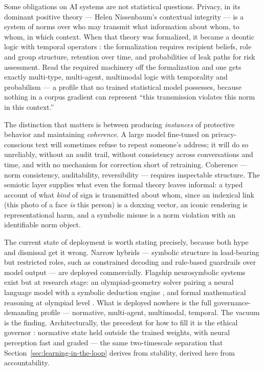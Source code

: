 \documentclass[11pt,a4paper]{article}
\begin{document}
Some obligations on AI systems are not statistical questions. Privacy, in
its dominant positive theory --- Helen Nissenbaum's contextual integrity
\autocite{nissenbaum2009privacy} --- is a system of norms over who may
transmit what information about whom, to whom, in which context. When that
theory was formalized, it became a deontic logic with temporal operators
\autocite{barth2006privacy}: the formalization requires recipient beliefs,
role and group structure, retention over time, and probabilities of leak
paths for risk assessment. Read the required machinery off the formalization
and one gets exactly multi-type, multi-agent, multimodal logic with
temporality and probabilism --- a profile that no trained statistical model
possesses, because nothing in a corpus gradient can represent ``this
transmission violates this norm in this context.''

The distinction that matters is between producing \emph{instances} of
protective behavior and maintaining \emph{coherence}. A large model fine-tuned
on privacy-conscious text will sometimes refuse to repeat someone's address;
it will do so unreliably, without an audit trail, without consistency across
conversations and time, and with no mechanism for correction short of
retraining. Coherence --- norm consistency, auditability, reversibility ---
requires inspectable structure. The semiotic layer supplies what even the
formal theory leaves informal: a typed account of what \emph{kind} of sign
is transmitted about whom, since an indexical link (this photo of a face
\emph{is} this person) is a doxxing vector, an iconic rendering is
representational harm, and a symbolic misuse is a norm violation with an
identifiable norm object.

The current state of deployment is worth stating precisely, because both
hype and dismissal get it wrong. Narrow hybrids --- symbolic structure in
load-bearing but restricted roles, such as constrained decoding and
rule-based guardrails over model output --- are deployed commercially.
Flagship neurosymbolic systems exist but at research stage: an
olympiad-geometry solver pairing a neural language model with a symbolic
deduction engine \autocite{trinh2024alphageometry}, and formal mathematical
reasoning at olympiad level \autocite{hubert2025alphaproof}. What is deployed
nowhere is the full governance-demanding profile --- normative, multi-agent,
multimodal, temporal. The vacuum is the finding. Architecturally, the
precedent for how to fill it is the ethical governor
\autocite{arkin2009governing}: normative state held outside the trained
weights, with neural perception fast and graded --- the same two-timescale
separation that Section~\ref{sec:learning-in-the-loop} derives from
stability, derived here from accountability.
\end{document}

